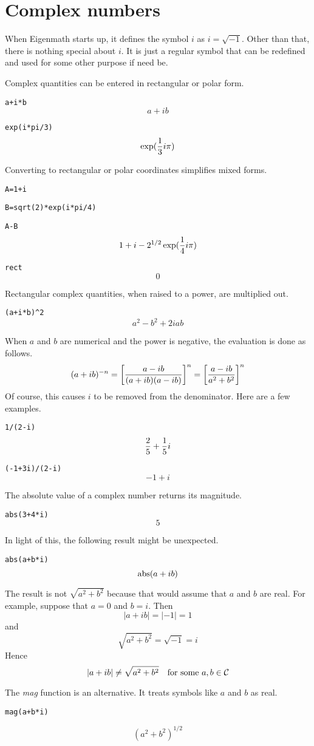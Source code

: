 \section*{Complex numbers}
When Eigenmath starts up, it defines the symbol $i$ as $i=\sqrt{-1}$.
Other than that, there is nothing special about $i$.
It is just a regular symbol that can be redefined and used for some other purpose if need be.

\medskip
\noindent
Complex quantities can be entered in rectangular or polar form.

\medskip
\verb$a+i*b$
$$a+ib$$

\verb$exp(i*pi/3)$
$$\exp({1\over3}i\pi)$$

\medskip
\noindent
Converting to rectangular or polar coordinates simplifies mixed forms.

\medskip
\verb$A=1+i$

\verb$B=sqrt(2)*exp(i*pi/4)$

\verb$A-B$
$$1+i-2^{1/2}\exp({1\over4}i\pi)$$

\verb$rect$
$$0$$

\medskip
\noindent
Rectangular complex quantities, when raised to a power, are multiplied out.

\medskip
\verb$(a+i*b)^2$
$$a^2-b^2+2iab$$

\medskip
\noindent
When $a$ and $b$ are numerical and the power is negative, the evaluation is done as follows.
$$(a+ib)^{-n}=\left[{a-ib\over(a+ib)(a-ib)}\right]^n=\left[{a-ib\over a^2+b^2}\right]^n$$
Of course, this causes $i$ to be removed from the denominator.
Here are a few examples.

\medskip
\verb$1/(2-i)$
$${2\over5}+{1\over5}i$$

\verb$(-1+3i)/(2-i)$
$$-1+i$$

\newpage

\noindent
The absolute value of a complex number returns its magnitude.

\medskip
\verb$abs(3+4*i)$
$$5$$

\medskip
\noindent
In light of this, the following result might be unexpected.

\medskip
\verb$abs(a+b*i)$
$$\mathop{\rm abs}(a+ib)$$

\medskip
\noindent
The result is not $\sqrt{a^2+b^2}$ because that would assume that
$a$ and $b$ are real.
For example, suppose that $a=0$ and $b=i$.
Then
$$|a+ib|=|-1|=1$$
and
$$\sqrt{a^2+b^2}=\sqrt{-1}=i$$
Hence
$$|a+ib|\ne\sqrt{a^2+b^2}\quad\hbox{for some $a,b\in\cal C$}$$

\medskip
\noindent
The {\it mag} function is an alternative.
It treats symbols like $a$ and $b$ as real.

\medskip
\verb$mag(a+b*i)$

$$(a^2+b^2)^{1/2}$$


